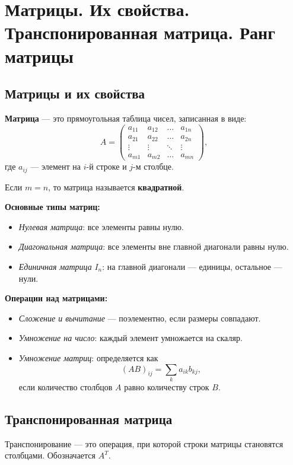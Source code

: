 \section{Матрицы. Их свойства. Транспонированная матрица. Ранг матрицы}

\subsection{Матрицы и их свойства}

\textbf{Матрица} — это прямоугольная таблица чисел, записанная в виде:
\[
A = \begin{pmatrix}
a_{11} & a_{12} & \dots & a_{1n} \\
a_{21} & a_{22} & \dots & a_{2n} \\
\vdots & \vdots & \ddots & \vdots \\
a_{m1} & a_{m2} & \dots & a_{mn}
\end{pmatrix},
\]
где $a_{ij}$ — элемент на $i$-й строке и $j$-м столбце.

Если $m = n$, то матрица называется \textbf{квадратной}.

\textbf{Основные типы матриц:}
\begin{itemize}[leftmargin=*]
  \item \textit{Нулевая матрица}: все элементы равны нулю.
  \item \textit{Диагональная матрица}: все элементы вне главной диагонали равны нулю.
  \item \textit{Единичная матрица} $I_n$: на главной диагонали — единицы, остальное — нули.
\end{itemize}

\textbf{Операции над матрицами:}
\begin{itemize}[leftmargin=*]
  \item \textit{Сложение и вычитание} — поэлементно, если размеры совпадают.
  \item \textit{Умножение на число}: каждый элемент умножается на скаляр.
  \item \textit{Умножение матриц}: определяется как
  \[
  (AB)_{ij} = \sum_k a_{ik} b_{kj},
  \]
  если количество столбцов $A$ равно количеству строк $B$.
\end{itemize}

\subsection{Транспонированная матрица}

Транспонирование — это операция, при которой строки матрицы становятся столбцами. Обозначается $A^T$.

